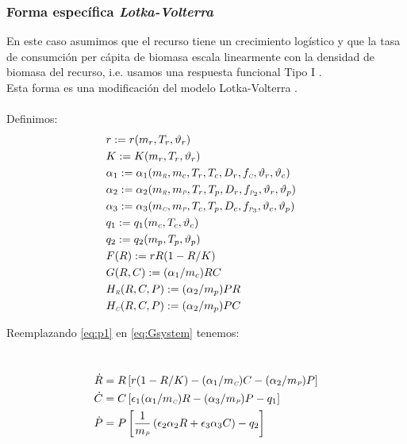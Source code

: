 \subsubsection{Forma espec\'ifica  \emph{Lotka-Volterra}}
En este caso asumimos que el recurso tiene un crecimiento log\'istico y que la tasa de consumci\'on per c\'apita de biomasa escala linearmente con la densidad de biomasa del recurso, i.e. usamos una respuesta funcional Tipo I \citep{gotelliprimer}.\\
Esta forma es una modificaci\'on del modelo Lotka-Volterra \citep{gotelliprimer}.\\
\mbox{}\\
Definimos:
\begin{equation}\label{eq:p1}
\begin{aligned}
&r := r(m_r,T_r,\vartheta_r)&\\ 
&K := K(m_r,T_r,\vartheta_r)&\\
&\alpha_{1} := \alpha_{1}(m_{\textit{\tiny R}},m_c,T_r,T_c,D_r,f_{\textit{\tiny C}},\vartheta_r,\vartheta_c)&\\
&\alpha_{2} := \alpha_{2}(m_{\textit{\tiny R}},m_{\textit{\tiny P}},T_r,T_p,D_r,f_{\textit{\tiny P}_2},\vartheta_r,\vartheta_p)&\\
&\alpha_{3} := \alpha_{3}(m_{\textit{\tiny C}},m_{\textit{\tiny P}},T_c,T_p,D_c,f_{\textit{\tiny P}_3},\vartheta_c,\vartheta_p)& \\
&q_1 := q_1(m_c,T_c,\vartheta_c)& \\ 
&q_2 := q_2(m_p,T_p,\vartheta_p)&\\
&F(R):= rR(1-R/K)& \\
&G(R,C):= (\alpha_1/m_c)RC &\\ 
&H_{\textit{\tiny R}}(R,C,P):= (\alpha_2/m_p)PR&\\
&H_{\textit{\tiny C}}(R,C,P):= (\alpha_2/m_p)PC&
\end{aligned}
\end{equation}

Reemplazando \eqref{eq:p1} en \eqref{eq:Gsystem} tenemos:

\
\begin{equation}
\begin{aligned} 
\dot{R} &= R\left[r(1-R/K)- (\alpha_{1}/m_{\textit{\tiny C}}) C -(\alpha_{2}/m_{\textit{\tiny P}}) P \right] \\
\dot{C} &= C \left[\epsilon_1 (\alpha_{1}/m_{\textit{\tiny C}}) R - (\alpha_{3} /m_{\textit{\tiny P}}) P - q_1\right] \\
\dot{P} &= P \left[\frac{1}{m_{\textit{\tiny P}}}\left(\epsilon_2 \alpha_{2}R + \epsilon_3 \alpha_{3}C \right) - q_2 \right]
\end{aligned}
\end{equation}

